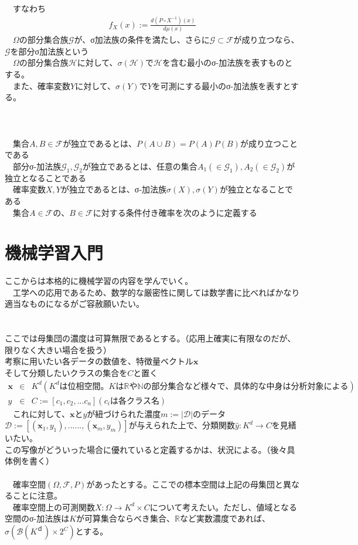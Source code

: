 \documentclass{jsarticle}
\begin{document}
　すなわち
\begin{eqnarray}
f_X(x):=\frac{d(P\circ X^{-1})(x)}{d\mu(x)}
\end{eqnarray}
　$\Omega$の部分集合族$\mathcal{G}$が、σ加法族の条件を満たし、さらに$\mathcal{G}\subset\mathcal{F}$が成り立つなら、$\mathcal{G}$を部分σ加法族という\\
　$\Omega$の部分集合族$\mathcal{H}$に対して、$\sigma(\mathcal{H})$で$\mathcal{H}$を含む最小のσ-加法族を表すものとする。\\
　また、確率変数$Y$に対して、$\sigma(Y)$で$Y$を可測にする最小のσ-加法族を表すとする。\\
　\\
　\\
\scalebox{1.1}{2.独立性と条件付き期待値}\\
　集合$A,B\in\mathcal{F}$が独立であるとは、$P(A\cup B)=P(A)P(B)$が成り立つことである\\
　部分σ-加法族$\mathcal{G}_1,\mathcal{G}_2$が独立であるとは、任意の集合$A_1(\in\mathcal{G}_1),A_2(\in\mathcal{G}_2)$が独立となることである\\
　確率変数$X,Y$が独立であるとは、σ-加法族$\sigma(X),\sigma(Y)$が独立となることである\\
　集合$A\in\mathcal{F}$の、$B\in\mathcal{F}$に対する条件付き確率を次のように定義する
\newpage
\section{機械学習入門}
ここからは本格的に機械学習の内容を学んでいく。\\
　工学への応用であるため、数学的な厳密性に関しては数学書に比べればかなり適当なものになるがご容赦願いたい。\\
　\\
\scalebox{1.1}{1.クラス分け}\\
ここでは母集団の濃度は可算無限であるとする。（応用上確実に有限なのだが、限りなく大きい場合を扱う）\\
考察に用いたい各データの数値を、特徴量ベクトル$\bm{x}$\\
そして分類したいクラスの集合を$C$と置く
\begin{eqnarray}
\bm{x}&\in & K^d(K^dは位相空間。Kは\mathbb{R}や\mathbb{N}の部分集合など様々で、具体的な中身は分析対象による)\\
y&\in&C:=[c_1,c_2,...c_n](c_iは各クラス名)
\end{eqnarray}
　これに対して、$\bm{x}$と$y$が紐づけられた濃度$m:=|\mathcal{D}|$のデータ$\mathcal{D}:=[(\bm{x}_1,y_1),......,(\bm{x}_m,y_m)]$が与えられた上で、分類関数$\hat{y}:K^d\rightarrow C$を見繕いたい。\\
この写像がどういった場合に優れていると定義するかは、状況による。（後々具体例を書く）\\
　\\
　確率空間$(\Omega,\mathcal{F},P)$があったとする。ここでの標本空間は上記の母集団と異なることに注意。\\
　確率空間上の可測関数$X:\Omega\rightarrow K^d\times C$について考えたい。ただし、値域となる空間のσ-加法族は$K$が可算集合ならべき集合、$\mathbb{R}$など実数濃度であれば、$\sigma(\mathcal{B}(K^ｄ)\times 2^C)$とする。\\
\end{document}
